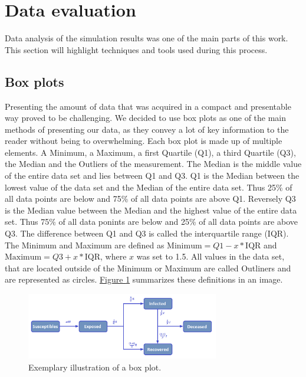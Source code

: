 \section{Data evaluation}
Data analysis of the simulation results was one of the main parts of this work. This section will highlight techniques and tools used during this process.

\subsection{Box plots}
Presenting the amount of data that was acquired in a compact and presentable way proved to be challenging. We decided to use box plots
as one of the main methods of presenting our data, as they convey a lot of key information to the reader without being to overwhelming.
Each box plot is made up of multiple elements. A Minimum, a Maximum, a first Quartile (Q1), a third Quartile (Q3), the Median and
the Outliers of the measurement. The Median is the middle value of the entire data set and lies between Q1 and Q3. Q1  is the Median 
between the lowest value of the data set and the Median of the entire data set. Thus 25\% of all data points are below and 75\% of
all data points are above Q1. Reversely Q3 is the Median value between the Median and the
highest value of the entire data set. Thus 75\% of all data ponints are below and 25\% of all data points are above Q3.
The difference between Q1 and Q3 is called the interquartile range (IQR). The Minimum and Maximum are
defined as $\text{Minimum} = Q1 - x*\text{IQR}$ and $\text{Maximum} = Q3 + x*\text{IQR}$, where $x$ was set to 1.5.
All values in the data set, that are located outside of the Minimum or Maximum are called Outliners and are represented as circles.
\hyperref[fig:boxplot]{Figure \ref*{fig:boxplot}} summarizes these definitions in an image.

\begin{figure}
	\begin{center}
		\includegraphics[width=0.75\textwidth]{./figures/SEIRD.png}
		\caption{Exemplary illustration of a box plot.
			}
		\label{fig:boxplot}
	\end{center}
\end{figure}


